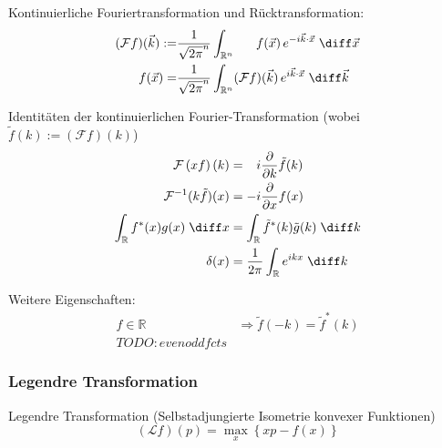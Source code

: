 \documentclass[11pt]{article}
\numberwithin{equation}{section}
\begin{document}
        Kontinuierliche Fouriertransformation und Rücktransformation:
        \begin{equation}
          \begin{aligned}
            (\mathcal{F}f)(\vec{k}) :=& \frac{1}{\sqrt{2\pi}^n}\int_{\mathbb{R}^n} \phantom{(\mathcal{F})}f(\vec{x})\, e^{-i\vec{k}\cdot\vec{x}}\;\diff\vec{x} \\
            \phantom{(\mathcal{F})}f(\vec{x}) =& \frac{1}{\sqrt{2\pi}^n}\int_{\mathbb{R}^n} (\mathcal{F}f)(\vec{k}) \,e^{i\vec{k}\cdot\vec{x}}\;\diff \vec{k} \\
          \end{aligned}
        \end{equation}

        Identitäten der kontinuierlichen Fourier-Transformation (wobei $\tilde{f}(k) := \left(\mathcal{F}f\right)(k)$)
        \begin{equation}
          \begin{aligned}
            \mathcal{F}\left(xf\right)(k) &= \phantom{-}i \pder{}{k}\tilde{f}(k) \\
            \mathcal{F}^{-1}(k\tilde{f})(x) &= -i\pder{}{x}f(x) \\
            \int_{\mathbb{R}} f^{*}(x) g(x)\;\diff x &=
            \int_{\mathbb{R}}\tilde{f}^{*}(k)\tilde{g}(k)\;\diff k \\
            \delta(x) &= \frac{1}{2\pi}\int_{\mathbb{R}}e^{ikx}\;\diff k \\
            \label{eq:fourierIdentities}
          \end{aligned}
        \end{equation}

        Weitere Eigenschaften:
        \begin{equation}
          \begin{aligned}
            f\in\mathbb{R}
            &\Rightarrow \tilde{f}(-k)=\tilde{f}^*(k) \\
            TODO: even odd fcts
          \end{aligned}
        \end{equation}

      \subsubsection{Legendre Transformation}
        Legendre Transformation (Selbstadjungierte Isometrie konvexer Funktionen)
        \begin{equation}
          (\mathcal{L}f)(p)=\max_x\left\lbrace xp-f(x) \right\rbrace
        \end{equation}
\end{document}
